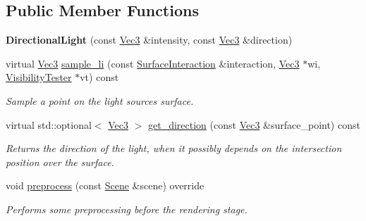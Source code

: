 \subsection*{Public Member Functions}
\begin{DoxyCompactItemize}
\item 
\mbox{\label{classomg_1_1_directional_light_abbc46171dd84ce2d36ba94d2775601d3}} 
{\bfseries Directional\+Light} (const \mbox{\hyperlink{namespaceomg_a45a9482677fee9933ff369b49894e316}{Vec3}} \&intensity, const \mbox{\hyperlink{namespaceomg_a45a9482677fee9933ff369b49894e316}{Vec3}} \&direction)
\item 
\mbox{\label{classomg_1_1_directional_light_a565733b42c77973b765d7afea14461f5}} 
virtual \mbox{\hyperlink{namespaceomg_a45a9482677fee9933ff369b49894e316}{Vec3}} \mbox{\hyperlink{classomg_1_1_directional_light_a565733b42c77973b765d7afea14461f5}{sample\+\_\+li}} (const \mbox{\hyperlink{classomg_1_1_surface_interaction}{Surface\+Interaction}} \&interaction, \mbox{\hyperlink{namespaceomg_a45a9482677fee9933ff369b49894e316}{Vec3}} $\ast$wi, \mbox{\hyperlink{classomg_1_1_visibility_tester}{Visibility\+Tester}} $\ast$vt) const
\begin{DoxyCompactList}\small\item\em Sample a point on the light source\textquotesingle{}s surface. \end{DoxyCompactList}\item 
virtual std\+::optional$<$ \mbox{\hyperlink{namespaceomg_a45a9482677fee9933ff369b49894e316}{Vec3}} $>$ \mbox{\hyperlink{classomg_1_1_directional_light_a5f5f490112ecf2c0dfb2613d1f831e5b}{get\+\_\+direction}} (const \mbox{\hyperlink{namespaceomg_a45a9482677fee9933ff369b49894e316}{Vec3}} \&surface\+\_\+point) const
\begin{DoxyCompactList}\small\item\em Returns the direction of the light, when it possibly depends on the intersection position over the surface. \end{DoxyCompactList}\item 
void \mbox{\hyperlink{classomg_1_1_directional_light_ae7df9384508e8692781f1e1df03ccf4e}{preprocess}} (const \mbox{\hyperlink{classomg_1_1_scene}{Scene}} \&scene) override
\begin{DoxyCompactList}\small\item\em Performs some preprocessing before the rendering stage. \end{DoxyCompactList}\end{DoxyCompactItemize}
